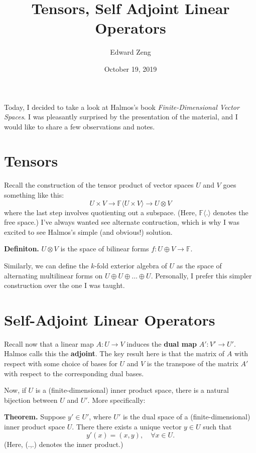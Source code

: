 \documentclass[12pt, a4paper]{article}
\title{Tensors, Self Adjoint Linear Operators}
\author{Edward Zeng}
\date{October 19, 2019}
\newcommand{\bF}{{\mathbb F}}
\begin{document}
\maketitle

Today, I decided to take a look at Halmos's book \textit{Finite-Dimensional Vector Spaces}. I was pleasantly surprised by the presentation of the material, and I would like to share a few observations and notes.

\section*{Tensors}

Recall the construction of the tensor product of vector spaces $U$ and $V$ goes something like this:
\[
    U \times V \rightarrow \bF \langle U \times V \rangle \rightarrow
    U \otimes V
\]
where the last step involves quotienting out a subspace. (Here, $\bF \langle . \rangle$ denotes the free space.) I've always wanted see alternate contruction, which is why I was excited to see Halmos's simple (and obvious!) solution.

\textbf{Definiton.} $U \otimes V$ is the space of bilinear forms $f: U \oplus V \rightarrow \bF$.

Similarly, we can define the $k$-fold exterior algebra of $U$ as the space of alternating multilinear forms on $U \oplus U \oplus \dots \oplus U$. Personally, I prefer this simpler construction over the one I was taught. 

\section*{Self-Adjoint Linear Operators}
Recall now that a linear map $A: U \rightarrow V$ induces the \textbf{dual map} $A': V' \rightarrow U'$. Halmos calls this the \textbf{adjoint}. The key result here is that the matrix of $A$ with respect with some choice of bases for $U$ and $V$ is the transpose of the matrix $A'$ with respect to the corresponding dual bases.

Now, if $U$ is a (finite-dimensional) inner product space, there is a natural bijection between $U$ and $U'$. More specifically:

\textbf{Theorem.} Suppose $y' \in U'$, where $U'$ is the dual space of a (finite-dimensional) inner product space $U$. There there exists a unique vector $y \in U$ such that
\[
    y'(x) = (x, y), \quad \forall x \in U.
\]
(Here, (.,.) denotes the inner product.)
\end{document}
